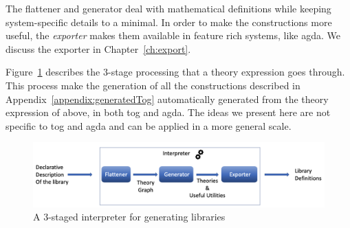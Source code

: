 The flattener and generator deal with mathematical definitions while keeping system-specific details to a minimal. In order to make the constructions more useful, the \emph{exporter} makes them available in feature rich systems, like agda. We discuss the exporter in Chapter~\ref{ch:export}. 

Figure~\ref{fig:staged-interpreter} describes the $3$-stage processing that a theory expression goes through. This process make the generation of all the constructions described in Appendix~\ref{appendix:generatedTog} automatically generated from the theory expression of  above, in both tog and agda. The ideas we present here are not specific to tog and agda and can be applied in a more general scale. 
\begin{figure}
\includegraphics[scale=0.5,width=\linewidth]{figures/interpreter_detailed}
\caption{A $3$-staged interpreter for generating libraries}
\label{fig:staged-interpreter}
\end{figure} 

